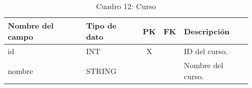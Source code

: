 \begin{table}[H]
	\centering
	\begin{tabular}{|l|l|c|c|l|}
		\hline
		\textbf{Nombre del campo} & \textbf{Tipo de dato} & \textbf{PK} & \textbf{FK} & \textbf{Descripción} \\
		\hline
		id                        & INT                   & X           &             & ID del curso.        \\
		\hline
		nombre                    & STRING                &             &             & Nombre del curso.    \\
		\hline
	\end{tabular}
	\caption{Cuadro 12: Curso}
\end{table}